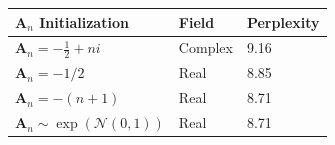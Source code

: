 \begin{tabular}{lll}
\hline
\textbf{$\bm{A}_{n}$ Initialization} & \textbf{Field} & \textbf{Perplexity} \\
\hline
\textbf{$\bm{A}_{n}=-\frac{1}{2}+ni$} & Complex & 9.16 \\
\textbf{$\bm{A}_{n}=-1/2$} & Real & 8.85 \\
\textbf{$\bm{A}_{n}=-(n+1)$} & Real & 8.71 \\
\textbf{$\bm{A}_{n}\sim\exp(\mathcal{N}(0,1))$} & Real & 8.71 \\
\hline
\end{tabular}
